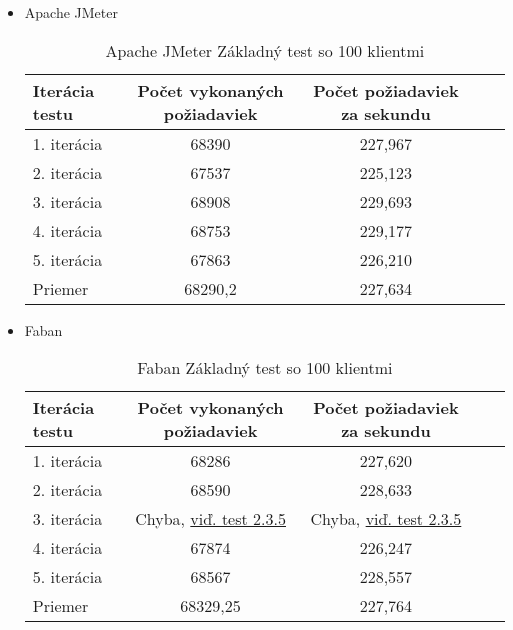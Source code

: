 \documentclass[12pt,oneside,final]{fithesis-utf8}
\begin{document}
\begin{itemize}

\item Apache JMeter

\begin{table}[H]
\begin{center}
\begin{tabular}{ | l | c | c | c | c |}
		\hline
		 \textbf{Iterácia testu} & \textbf{Počet vykonaných požiadaviek} & \textbf{Počet požiadaviek za sekundu} \\ \hline
		 1. iterácia & 68390 & 227,967 \\ \hline
		 2. iterácia & 67537 & 225,123 \\ \hline
		 3. iterácia & 68908 & 229,693 \\ \hline
		 4. iterácia & 68753 & 229,177 \\ \hline
		 5. iterácia & 67863 & 226,210 \\ \hline
		 Priemer & 68290,2 & 227,634 \\ \hline
		 
\end{tabular}
\end{center}
\caption{Apache JMeter Základný test so 100 klientmi}
\end{table}


\item Faban

\begin{table}[H]
\begin{center}
\begin{tabular}{ | l | c | c | c | c |}
		\hline
		 \textbf{Iterácia testu} & \textbf{Počet vykonaných požiadaviek} & \textbf{Počet požiadaviek za sekundu} \\ \hline
		 1. iterácia & 68286 & 227,620 \\ \hline
		 2. iterácia & 68590 & 228,633 \\ \hline
		 3. iterácia & Chyba, \hyperlink{label}{viď. test 2.3.5} & Chyba, \hyperlink{label}{viď. test 2.3.5} \\ \hline
		 4. iterácia & 67874 & 226,247 \\ \hline
		 5. iterácia & 68567 & 228,557 \\ \hline
		 Priemer & 68329,25 & 227,764 \\ \hline
		 
\end{tabular}
\end{center}
\caption{Faban Základný test so 100 klientmi}
\end{table}



\end{itemize}
\end{document}
